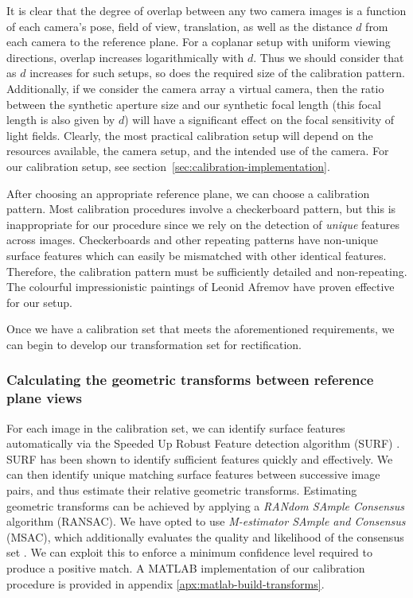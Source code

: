 \documentclass[../main.tex]{subfiles}
\begin{document}
\newpage
It is clear that the degree of overlap between any two camera images is a function of each camera's pose, field of view, translation, as well as the distance $d$ from each camera to the reference plane. For a coplanar setup with uniform viewing directions, overlap increases logarithmically with $d$. Thus we should consider that as $d$ increases for such setups, so does the required size of the calibration pattern. Additionally, if we consider the camera array a virtual camera, then the ratio between the synthetic aperture size and our synthetic focal length (this focal length is also given by $d$) will have a significant effect on the focal sensitivity of light fields. Clearly, the most practical calibration setup will depend on the resources available, the camera setup, and the intended use of the camera. For our calibration setup, see section~\ref{sec:calibration-implementation}.

After choosing an appropriate reference plane, we can choose a calibration pattern. Most calibration procedures involve a checkerboard pattern, but this is inappropriate for our procedure since we rely on the detection of \emph{unique} features across images. Checkerboards and other repeating patterns have non-unique surface features which can easily be mismatched with other identical features. Therefore, the calibration pattern must be sufficiently detailed and non-repeating. The colourful impressionistic paintings of Leonid Afremov have proven effective for our setup.

Once we have a calibration set that meets the aforementioned requirements, we can begin to develop our transformation set for rectification. 

\subsubsection{Calculating the geometric transforms between reference plane views}
For each image in the calibration set, we can identify surface features automatically via the Speeded Up Robust Feature detection algorithm (SURF) \cite{bay2006surf}. SURF has been shown to identify sufficient features quickly and effectively. We can then identify unique matching surface features between successive image pairs, and thus estimate their relative geometric transforms. Estimating geometric transforms can be achieved by applying a \emph{RANdom SAmple Consensus} algorithm (RANSAC). We have opted to use \emph{M-estimator SAmple and Consensus} (MSAC), which additionally evaluates the quality and likelihood of the consensus set \cite{torr2000mlesac}. We can exploit this to enforce a minimum confidence level required to produce a positive match. A MATLAB implementation of our calibration procedure is provided in appendix \ref{apx:matlab-build-transforms}.
\end{document}
